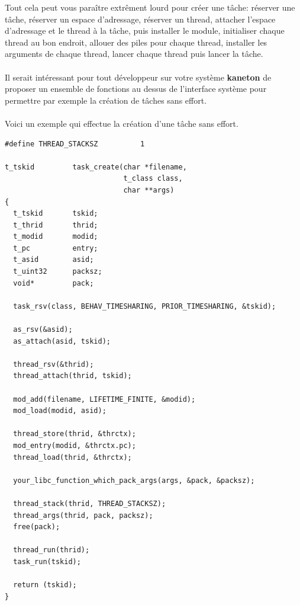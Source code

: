 \documentclass[10pt,a4wide]{article}
\begin{document}
Tout cela peut vous para\^itre extr\^ement lourd pour cr\'eer une t\^ache:
r\'eserver une t\^ache, r\'eserver un espace d'adressage, r\'eserver
un thread, attacher l'espace d'adressage et le thread \`a la t\^ache, puis
installer le module, initialiser chaque thread au bon endroit, allouer des
piles pour chaque thread, installer les arguments de chaque thread,
lancer chaque thread puis lancer la t\^ache.

\paragraph{}

Il serait int\'eressant pour tout d\'eveloppeur sur votre syst\`eme
\textbf{kaneton} de proposer un ensemble de fonctions au dessus de
l'interface syst\`eme pour permettre par exemple la cr\'eation de t\^aches
sans effort.

\paragraph{}

Voici un exemple qui effectue la cr\'eation d'une t\^ache sans effort.

\begin{verbatim}
#define THREAD_STACKSZ          1

t_tskid         task_create(char *filename,
                            t_class class,
                            char **args)
{
  t_tskid       tskid;
  t_thrid       thrid;
  t_modid       modid;
  t_pc          entry;
  t_asid        asid;
  t_uint32      packsz;
  void*         pack;

  task_rsv(class, BEHAV_TIMESHARING, PRIOR_TIMESHARING, &tskid);

  as_rsv(&asid);
  as_attach(asid, tskid);

  thread_rsv(&thrid);
  thread_attach(thrid, tskid);

  mod_add(filename, LIFETIME_FINITE, &modid);
  mod_load(modid, asid);

  thread_store(thrid, &thrctx);
  mod_entry(modid, &thrctx.pc);
  thread_load(thrid, &thrctx);

  your_libc_function_which_pack_args(args, &pack, &packsz);

  thread_stack(thrid, THREAD_STACKSZ);
  thread_args(thrid, pack, packsz);
  free(pack);

  thread_run(thrid);
  task_run(tskid);

  return (tskid);
}
\end{verbatim}
\end{document}
